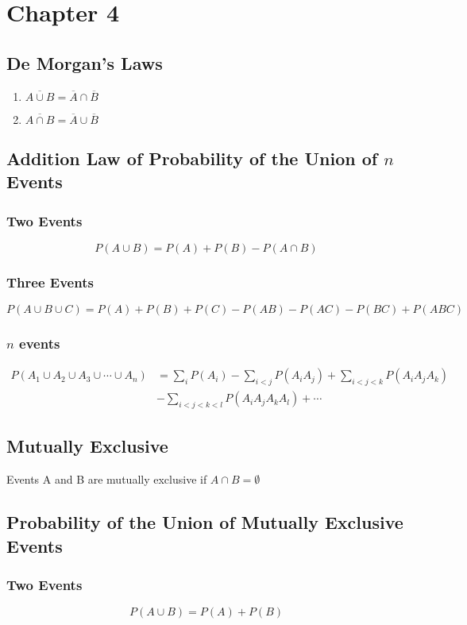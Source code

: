 \documentclass[11pt]{article}
\begin{document}
\section{Chapter 4}
\subsection{De Morgan's Laws}
\begin{enumerate}
    \item $\overline{A\cup B} = \overline{A}\cap\overline{B}$
    \item $\overline{A\cap B} = \overline{A}\cup\overline{B}$
\end{enumerate}
\subsection{Addition Law of Probability of the Union of $n$ Events}
\subsubsection{Two Events}
\[P(A\cup B) = P(A)+P(B)-P(A\cap B)\]
\subsubsection{Three Events}
\[P(A\cup B\cup C) = P(A)+P(B)+P(C) - P(AB)-P(AC)-P(BC) + P(ABC)\]
\subsubsection{$n$ events}
\begin{align*}
    P(A_1\cup A_2\cup A_3\cup\cdots\cup A_n) &= \sum_{i}P(A_i) - \sum_{i<j}P(A_iA_j) + \sum_{i<j<k}P(A_iA_jA_k) \\
                                             &- \sum_{i<j<k<l}P(A_iA_jA_kA_l) + \cdots 
\end{align*}
\subsection{Mutually Exclusive}
Events A and B are mutually exclusive if $A\cap B = \emptyset$
\subsection{Probability of the Union of Mutually Exclusive Events}
\subsubsection{Two Events}
\[P(A\cup B) = P(A) + P(B)\]
\end{document}
